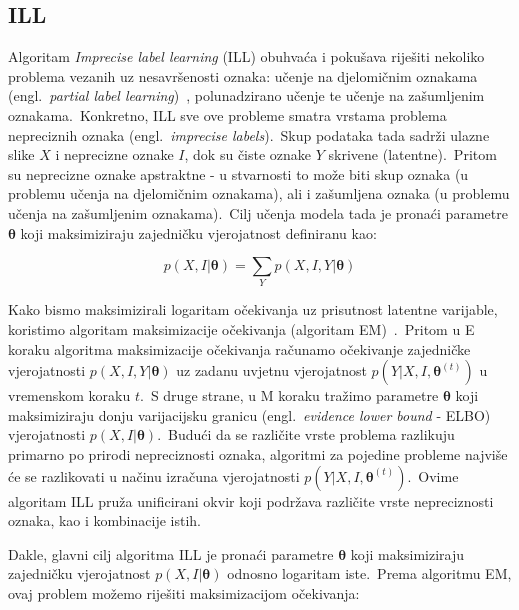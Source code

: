 \documentclass[diplomskirad]{fer}
\begin{document}
\pagebreak

\subsection{ILL}
\label{sub:ill}

Algoritam \textit{Imprecise label learning} (ILL) obuhvaća i pokušava riješiti nekoliko problema vezanih uz nesavršenosti oznaka: učenje na djelomičnim oznakama (engl.\ \textit{partial label learning})~\cite{tian2023partial}, polunadzirano učenje te učenje na zašumljenim oznakama.\ 
Konkretno, ILL sve ove probleme smatra vrstama problema nepreciznih oznaka (engl.\ \textit{imprecise labels}).\ Skup podataka tada sadrži ulazne slike $X$ i neprecizne oznake $I$, dok su čiste oznake $Y$ skrivene (latentne).\ 
Pritom su neprecizne oznake apstraktne - u stvarnosti to može biti skup oznaka (u problemu učenja na djelomičnim oznakama), ali i zašumljena oznaka (u problemu učenja na zašumljenim oznakama).\ 
Cilj učenja modela tada je pronaći parametre $\bm{\theta}$ koji maksimiziraju zajedničku vjerojatnost definiranu kao: 

\begin{equation}
  p(X, I | \bm{\theta}) = \sum_{Y} p(X, I, Y | \bm{\theta})
  \label{eq:ill_joint}
\end{equation}

Kako bismo maksimizirali logaritam očekivanja uz prisutnost latentne varijable, koristimo algoritam maksimizacije očekivanja (algoritam EM)~\cite{moon1996expectation}.\
Pritom u E koraku algoritma maksimizacije očekivanja računamo očekivanje zajedničke vjerojatnosti $p(X, I, Y | \bm{\theta})$ uz zadanu uvjetnu vjerojatnost $p(Y | X, I, \bm{\theta}^{(t)})$ u vremenskom koraku $t$.\ 
S druge strane, u M koraku tražimo parametre $\bm{\theta}$ koji maksimiziraju donju varijacijsku granicu (engl.\ \textit{evidence lower bound} - ELBO) vjerojatnosti $p(X, I | \bm{\theta})$.\ 
Budući da se različite vrste problema razlikuju primarno po prirodi nepreciznosti oznaka, algoritmi za pojedine probleme najviše će se razlikovati u načinu izračuna vjerojatnosti $p(Y | X, I, \bm{\theta}^{(t)})$.\
Ovime algoritam ILL pruža unificirani okvir koji podržava različite vrste nepreciznosti oznaka, kao i kombinacije istih.\

Dakle, glavni cilj algoritma ILL je pronaći parametre $\bm{\theta}$ koji maksimiziraju zajedničku vjerojatnost $p(X, I | \bm{\theta})$ odnosno logaritam iste.\
Prema algoritmu EM, ovaj problem možemo riješiti maksimizacijom očekivanja:
\end{document}
